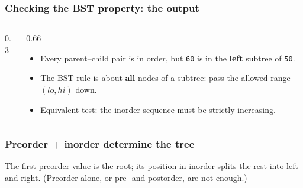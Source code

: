 \documentclass[aspectratio=169,10pt,compress]{beamer}
\begin{document}
\begin{frame}[t,fragile] \frametitle{Checking the BST property: the output}
  \begin{columns}[T]
    \begin{column}{0.3\textwidth}
      \begin{center}
      \end{center}
    \end{column}
    \begin{column}{0.66\textwidth}
      \begin{itemize}\small
        \item Every parent--child pair is in order, but \texttt{60} is in the \textbf{left} subtree of \texttt{50}.
        \item The BST rule is about \textbf{all} nodes of a subtree: pass the allowed range $(lo, hi)$ down.
        \item Equivalent test: the inorder sequence must be strictly increasing.
      \end{itemize}
    \end{column}
  \end{columns}
\end{frame}





\begin{frame}[t,fragile] \frametitle{Preorder + inorder determine the tree}

  \vspace{0.2em}
  \small The first preorder value is the root; its position in inorder splits the rest into left and right. (Preorder alone, or pre- and postorder, are not enough.)
\end{frame}
\end{document}
